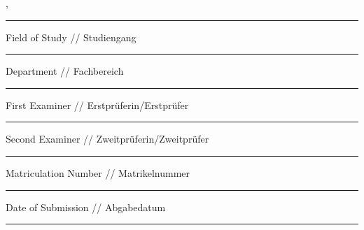 {\begin{titlepage}
			\vskip -0.18cm

			\begingroup
			\fontsize{12pt}{14pt}\selectfont
				{\@authorFirstname} {\@authorLastname}, {\@authorBirthplace}
			\endgroup
			\vskip -0.18cm

			\noindent\rule{15cm}{0.4pt}
			
			\vskip 0.04cm

			\begingroup
			\fontsize{8pt}{6pt}\selectfont
			Field of Study // Studiengang
			\endgroup

			\vskip -0.18cm

			\begingroup
			\fontsize{12pt}{14pt}\selectfont
				{\@courseOfStudies}
			\endgroup
			\vskip -0.18cm

			\noindent\rule{15cm}{0.4pt}
			
			\vskip 0.04cm

			\begingroup
			\fontsize{8pt}{6pt}\selectfont
			Department // Fachbereich
			\endgroup

			\vskip -0.18cm

			\begingroup
			\fontsize{12pt}{14pt}\selectfont
				{\@discipline}
			\endgroup
			\vskip -0.18cm

			\noindent\rule{15cm}{0.4pt}
			
			\vskip 0.04cm

			\begingroup
			\fontsize{8pt}{6pt}\selectfont
			First Examiner // Erstprüferin/Erstprüfer
			\endgroup

			\vskip -0.18cm

			\begingroup
			\fontsize{12pt}{14pt}\selectfont
				{\@firstExaminer}
			\endgroup
			\vskip -0.18cm

			\noindent\rule{15cm}{0.4pt}
			
			\vskip 0.04cm

			\begingroup
			\fontsize{8pt}{6pt}\selectfont
			Second Examiner // Zweitprüferin/Zweitprüfer
			\endgroup

			\vskip -0.18cm

			\begingroup
			\fontsize{12pt}{14pt}\selectfont
				{\@secondExaminer}
			\endgroup
			\vskip -0.18cm

			\noindent\rule{15cm}{0.4pt}
			
			\vskip 0.04cm

			\begingroup
			\fontsize{8pt}{6pt}\selectfont
			Matriculation Number // Matrikelnummer
			\endgroup

			\vskip -0.18cm

			\begingroup
			\fontsize{12pt}{14pt}\selectfont
				{\@matrikelnr}
			\endgroup
			\vskip -0.18cm

			\noindent\rule{15cm}{0.4pt}

			\vskip 0.04cm

			\begingroup
			\fontsize{8pt}{6pt}\selectfont
			Date of Submission // Abgabedatum
			\endgroup

			\vskip -0.18cm

			\begingroup
			\fontsize{12pt}{14pt}\selectfont
				{\@submitDate}
			\endgroup
			\vskip -0.18cm

			\noindent\rule{15cm}{0.4pt}
		\restoregeometry
	\end{titlepage}
}
\makeatother
